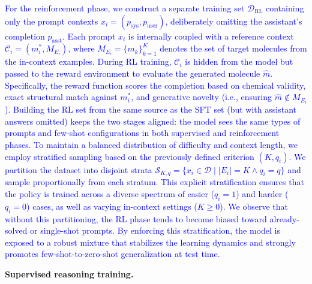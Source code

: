 \documentclass[11pt]{article}
\begin{document}
\textcolor{blue}{For the reinforcement phase, we construct a separate training set $\mathcal{D}_{\text{RL}}$ containing only the prompt contexts $x_i = (p_{\text{sys}}, p_{\text{user}})$, deliberately omitting the assistant's completion $p_{\text{asst}}$. Each prompt $x_i$ is internally coupled with a reference context $\mathcal{C}_i = (m_i^*, M_{E_i})$, where $M_{E_i} = \{m_k\}_{k=1}^K$ denotes the set of target molecules from the in-context examples. During RL training, $\mathcal{C}_i$ is hidden from the model but passed to the reward environment to evaluate the generated molecule $\hat{m}$. Specifically, the reward function scores the completion based on chemical validity, exact structural match against $m_i^*$, and generative novelty (i.e., ensuring $\hat{m} \notin M_{E_i}$). Building the RL set from the same source as the SFT set (but with assistant answers omitted) keeps the two stages aligned: the model sees the same types of prompts and few-shot configurations in both supervised and reinforcement phases.
To maintain a balanced distribution of difficulty and context length, we employ stratified sampling based on the previously defined criterion $(K, q_i)$. We partition the dataset into disjoint strata $\mathcal{S}_{K, q} = \{ x_i \in \mathcal{D} \mid |E_i| = K \land q_i = q \}$ and sample proportionally from each stratum. This explicit stratification ensures that the policy is trained across a diverse spectrum of easier ($q_i=1$) and harder ($q_i=0$) cases, as well as varying in-context settings ($K \ge 0$). We observe that without this partitioning, the RL phase tends to become biased toward already-solved or single-shot prompts. By enforcing this stratification, the model is exposed to a robust mixture that stabilizes the learning dynamics and strongly promotes few-shot-to-zero-shot generalization at test time.}

\noindent\textbf{Supervised reasoning training.}
\end{document}
